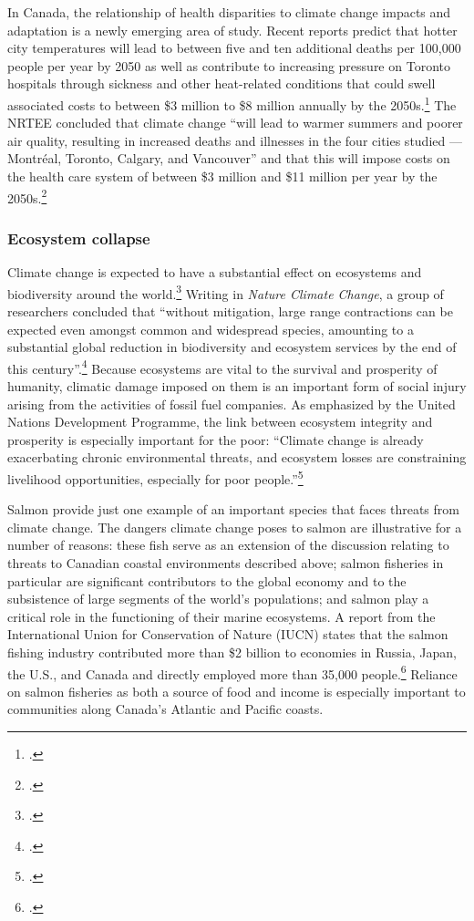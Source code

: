 In Canada, the relationship of health disparities to climate change impacts and adaptation is a newly emerging area of study. 
Recent reports predict that hotter city temperatures will lead to between five and ten additional deaths per 100,000 people per year by 2050 as well as contribute to increasing pressure on Toronto hospitals through sickness and other heat-related conditions that could swell associated costs to between \$3 million to \$8 million annually by the 2050s.\footcite[][p. 87]{NRTEEPrice}
The NRTEE concluded that climate change ``will lead to warmer summers and poorer air quality, resulting in increased deaths and illnesses in the four cities studied — Montréal, Toronto, Calgary, and Vancouver'' and that this will impose costs on the health care system of between \$3 million and \$11 million per year by the 2050s.\footcite[][p. 16]{NRTEEPrice}



	\subsubsection{Ecosystem collapse}



Climate change is expected to have a substantial effect on ecosystems and biodiversity around the world.\footcite[][p. 1]{VulnerableSpecies}
Writing in \emph{Nature Climate Change}, a group of researchers concluded that ``without mitigation, large range contractions can be expected even amongst common and widespread species, amounting to a substantial global reduction in biodiversity and ecosystem services by the end of this century''.\footcite[][p. 1]{WarrenBiodiversity}
Because ecosystems are vital to the survival and prosperity of humanity, climatic damage imposed on them is an important form of social injury arising from the activities of fossil fuel companies.
As emphasized by the United Nations Development Programme, the link between ecosystem integrity and prosperity is especially important for the poor: ``Climate change is already exacerbating chronic environmental threats, and ecosystem losses are constraining livelihood opportunities, especially for poor people.''\footcite[][p. 95]{UNHumanDev2013}



Salmon provide just one example of an important species that faces threats from climate change. 
The dangers climate change poses to salmon are illustrative for a number of reasons: these fish serve as an extension of the discussion relating to threats to Canadian coastal environments described above; salmon fisheries in particular are significant contributors to the global economy and to the subsistence of large segments of the world’s populations; and salmon play a critical role in the functioning of their marine ecosystems.
A report from the International Union for Conservation of Nature (IUCN) states that the salmon fishing industry contributed more than \$2 billion to economies in Russia, Japan, the U.S., and Canada and directly employed more than 35,000 people.\footcite[][p. 2]{IUCNSalmon}
Reliance on salmon fisheries as both a source of food and income is especially important to communities along Canada's Atlantic and Pacific coasts. 



